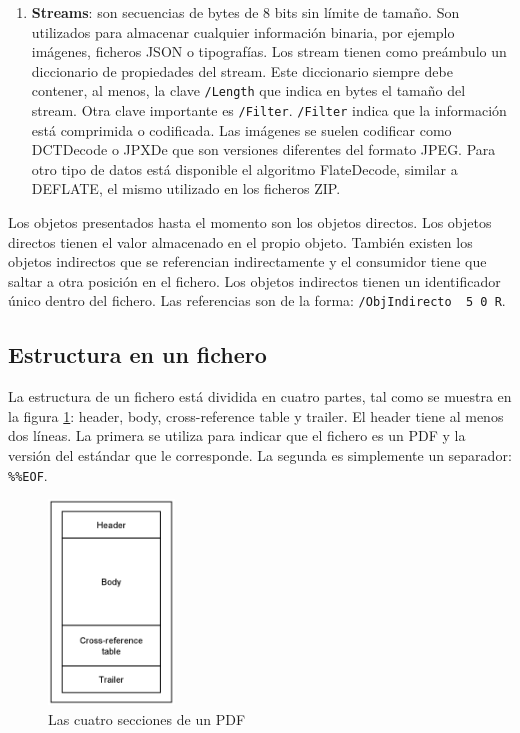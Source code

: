 \begin{enumerate}
    \item \textbf{Streams}: son secuencias de bytes de 8 bits sin límite de tamaño. Son utilizados para almacenar cualquier información binaria, por ejemplo imágenes, ficheros JSON o tipografías. Los stream tienen como preámbulo un diccionario de propiedades del stream. Este diccionario siempre debe contener, al menos, la clave \verb|/Length| que indica en bytes el tamaño del stream. Otra clave importante es \verb|/Filter|. \verb|/Filter| indica que la información está comprimida o codificada. Las imágenes se suelen codificar como DCTDecode o JPXDe que son versiones diferentes del formato JPEG. Para otro tipo de datos está disponible el algoritmo FlateDecode, similar a  DEFLATE, el mismo utilizado en los ficheros ZIP.
\end{enumerate}

Los objetos presentados hasta el momento son los objetos directos. Los objetos directos tienen el valor almacenado en el propio objeto. También existen los objetos indirectos que se referencian indirectamente y el consumidor tiene que saltar a otra posición en el fichero. Los objetos indirectos tienen un identificador único dentro del fichero. Las referencias son de la forma: \verb|/ObjIndirecto  5 0 R|.

\subsection{Estructura en un fichero}

La estructura de un fichero está dividida en cuatro partes, tal como se muestra en la figura \ref{fig:secciones-pdf}: header, body, cross-reference table y trailer. El header tiene al menos dos líneas. La primera se utiliza para indicar que el fichero es un PDF y la versión del estándar que le corresponde. La segunda es simplemente un separador: \verb|%%EOF|. 

\begin{figure}[hp!]
    \centering
    \includegraphics[width=0.3\textwidth]{imaxes/c-bases-teoricas/secciones-de-un-pdf.png}
    \caption{Las cuatro secciones de un PDF}
    \label{fig:secciones-pdf}
\end{figure}

